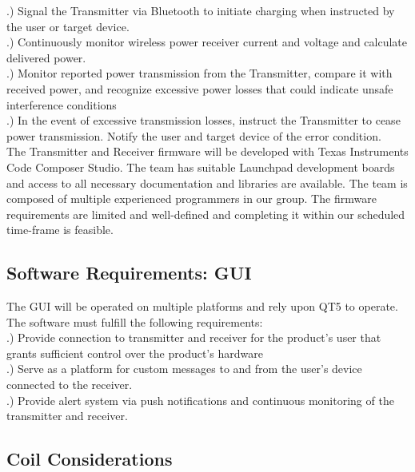 \documentclass[12pt]{article}
\begin{document}
.) Signal the Transmitter via Bluetooth to initiate charging when instructed by the user or target device.\\

.) Continuously monitor wireless power receiver current and voltage and calculate delivered power.\\

.) Monitor reported power transmission from the Transmitter, compare it with received power, and recognize excessive power losses that could indicate unsafe interference conditions\\

.) In the event of excessive transmission losses, instruct the Transmitter to cease power transmission. Notify the user and target device of the error condition.\\

\indent
The Transmitter and Receiver firmware will be developed with Texas Instruments Code Composer Studio. The team has suitable Launchpad development boards and access to all necessary documentation and libraries are available. The team is composed of multiple experienced programmers in our group. The firmware requirements are limited and well-defined and completing it within our scheduled time-frame is feasible.


\subsection{Software Requirements: GUI}

The GUI will be operated on multiple platforms and rely upon QT5 to operate.  The software must fulfill the following requirements:\\

.) Provide connection to transmitter and receiver for the product's user that grants sufficient control over the product's hardware\\

.) Serve as a platform for custom messages to and from the user's device connected to the receiver.\\

.) Provide alert system via push notifications and continuous monitoring of the transmitter and receiver.\\

\pagebreak

\subsection{Coil Considerations}
\end{document}
